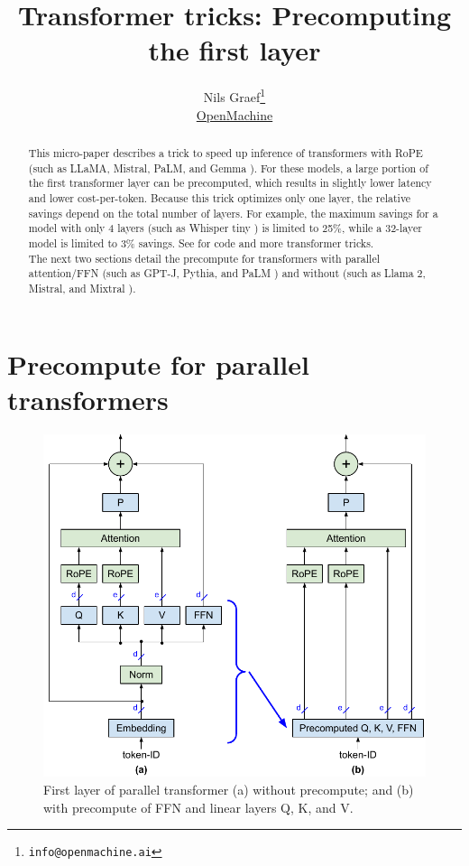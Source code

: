 \documentclass{article}
\title{Transformer tricks: Precomputing the first layer}
\author{Nils Graef\thanks{\texttt{info@openmachine.ai}} \\
  \href{https://openmachine.ai}{OpenMachine}}
\begin{document}
 \maketitle

\begin{abstract}
This micro-paper \cite{micro-paper} describes a trick to speed up inference of transformers with RoPE \citep{RoPE} (such as LLaMA, Mistral, PaLM, and Gemma \citep{gemma}). For these models, a large portion of the first transformer layer can be precomputed, which results in slightly lower latency and lower cost-per-token.
Because this trick optimizes only one layer, the relative savings depend on the total number of layers. For example, the maximum savings for a model with only 4 layers (such as Whisper tiny \citep{Whisper}) is limited to 25\%, while a 32-layer model is limited to 3\% savings. See \citep{tricks, slimAttn, flashNorm, remove, matShrink} for code and more transformer tricks. \\
The next two sections detail the precompute for transformers with parallel attention/FFN \citep{parallel} (such as GPT-J, Pythia, and PaLM \citep{parallel, Pythia, PaLM}) and without (such as Llama 2, Mistral, and Mixtral \citep{LLaMA, Llama2, Mistral, Mixtral}).
\end{abstract}

\section{Precompute for parallel transformers}

\begin{figure}[h!] \centering  %
  \includegraphics[scale=0.86]{../doc/fig/precomp1stLayer_fig1.pdf}
  \caption{First layer of parallel transformer (a) without precompute; and (b) with precompute of FFN and linear layers Q, K, and V.}
\label{fig1} \end{figure}
\end{document}
